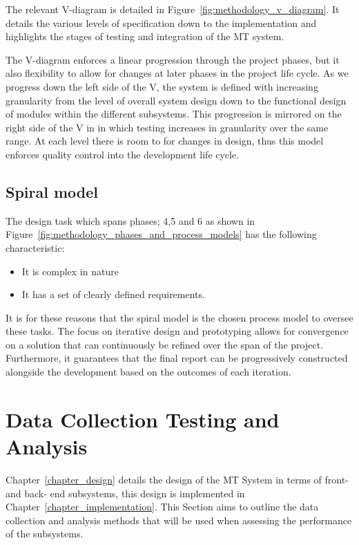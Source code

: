 The relevant V-diagram is detailed in Figure~\ref{fig:methodology_v_diagram}. It
details the various levels of specification down to the implementation and
highlights the stages of testing and integration of the MT system.

The V-diagram enforces a linear progression through the project phases, but it
also flexibility to allow for changes at later phases in the project life cycle.
As we progress down the left side of the V, the system is defined with
increasing granularity from the level of overall system design down to the
functional design of modules within the different subsystems. This progression is mirrored on the right
side of the V in in which testing increases in granularity over the same range.
At each level there is room to for changes in design, thus this model enforces
quality control into the development life cycle.


\subsection{Spiral model}
The design task which spans phases; 4,5 and 6 as shown in
Figure~\ref{fig:methodology_phases_and_process_models} has the following
characteristic: 
\begin{itemize}
    \item It is complex in nature
    \item It has a set of clearly defined requirements. 
\end{itemize}

It is for these reasons that the spiral model is the chosen process model to
oversee these tasks. The focus on iterative design and prototyping allows for
convergence on a solution that can continuously be refined over the span of the
project. Furthermore, it guarantees that the final report can be progressively
constructed alongside the development based on the outcomes of each iteration.

\section{Data Collection Testing and Analysis}\label{methodology_testing}
Chapter~\ref{chapter_design} details the design of the MT System in terms of
front- and back- end subsystems, this design is implemented in
Chapter~\ref{chapter_implementation}. This Section aims to outline the data
collection and analysis methods that will be used when assessing the
performance of the subsystems.

